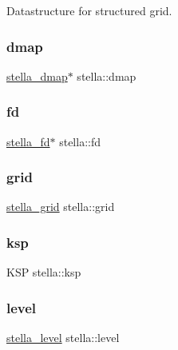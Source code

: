 Datastructure for structured grid. 

\mbox{\label{structstella_aa9dd28e08c583f4b2232f74d6d440395}} 
\subsubsection{\texorpdfstring{dmap}{dmap}}
{\footnotesize\ttfamily \mbox{\hyperlink{structstella__dmap}{stella\+\_\+dmap}}$\ast$ stella\+::dmap}

\mbox{\label{structstella_a2b9a931f9cf44797836bb26724063467}} 
\subsubsection{\texorpdfstring{fd}{fd}}
{\footnotesize\ttfamily \mbox{\hyperlink{structstella__fd}{stella\+\_\+fd}}$\ast$ stella\+::fd}

\mbox{\label{structstella_adae4ed751e9c9791ef5af4eb459a3761}} 
\subsubsection{\texorpdfstring{grid}{grid}}
{\footnotesize\ttfamily \mbox{\hyperlink{structstella__grid}{stella\+\_\+grid}} stella\+::grid}

\mbox{\label{structstella_a18c7afda86d38f4cb8fe7eb32daf1325}} 
\subsubsection{\texorpdfstring{ksp}{ksp}}
{\footnotesize\ttfamily K\+SP stella\+::ksp}

\mbox{\label{structstella_a67297e1354ac246b9150d546c4db65af}} 
\subsubsection{\texorpdfstring{level}{level}}
{\footnotesize\ttfamily \mbox{\hyperlink{structstella__level}{stella\+\_\+level}} stella\+::level}

